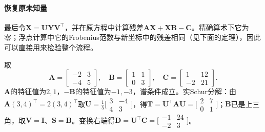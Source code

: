 \paragraph{恢复原未知量}
最后令$\bm X=\bm U\bm Y\bm V^\top$，并在原方程中计算残差$\bm A\bm X+\bm X\bm B-\bm C$。精确算术下它为零；浮点计算中它的Frobenius范数与新坐标中的残差相同（见下面的定理），因此可以直接用来检验整个流程。

\begin{example}
\label{ex:ls-bartels-stewart-2x2}
取
\[
 \bm A=\begin{bmatrix}-2&3\\-4&5\end{bmatrix},\quad
 \bm B=\begin{bmatrix}1&1\\0&3\end{bmatrix},\quad
 \bm C=\begin{bmatrix}1&12\\-2&21\end{bmatrix}.
\]
$\bm A$的特征值为$2,1$，$-\bm B$的特征值为$-1,-3$，谱条件成立。实Schur分解：由$\bm A(3,4)^\top=2(3,4)^\top$取$\bm U=\tfrac15\bigl[\begin{smallmatrix}3&-4\\4&3\end{smallmatrix}\bigr]$，得$\bm T=\bm U^\top\bm A\bm U=\bigl[\begin{smallmatrix}2&7\\0&1\end{smallmatrix}\bigr]$；$\bm B$已是上三角，取$\bm V=\bm I$、$\bm S=\bm B$。变换右端得$\bm D=\bm U^\top\bm C=\bigl[\begin{smallmatrix}-1&24\\-2&3\end{smallmatrix}\bigr]$。


\end{example}
